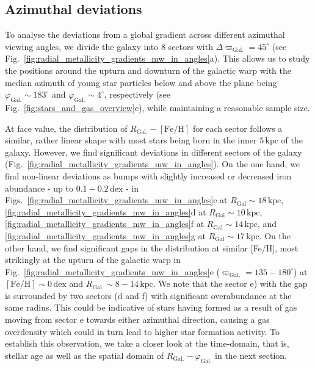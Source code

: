 \documentclass[twocolumn,apj,numberedappendix,appendixfloats,twocolappendix]{openjournal}
\begin{document}
\begin{CJK*}{UTF8}{gbsn}
\subsection{Azimuthal deviations}
\label{sec:coherence_azimuth_radial_metallicity_gradients}

To analyse the deviations from a global gradient across different azimuthal viewing angles, we divide the galaxy into 8 sectors with $\Delta \varpi_\mathrm{Gal.} = 45^\circ$ (see Fig.~\ref{fig:radial_metallicity_gradients_mw_in_angles}a). This allows us to study the positions around the upturn and downturn of the galactic warp with the median azimuth of young star particles below and above the plane being $\varphi_\mathrm{Gal.} \sim 183^\circ$ and $\varphi_\mathrm{Gal.} \sim 4^\circ$, respectively (see Fig.~\ref{fig:stars_and_gas_overview}e), while maintaining a reasonable sample size.

At face value, the distribution of $R_\mathrm{Gal.}-\mathrm{[Fe/H]}$ for each sector follows a similar, rather linear shape with most stars being born in the inner $5\,\mathrm{kpc}$ of the galaxy. However, we find significant deviations in different sectors of the galaxy (Fig.~\ref{fig:radial_metallicity_gradients_mw_in_angles}). On the one hand, we find non-linear deviations as bumps with slightly increased or decreased iron abundance - up to $0.1-0.2\,\mathrm{dex}$ - in Figs.~\ref{fig:radial_metallicity_gradients_mw_in_angles}c at $R_\mathrm{Gal} \sim 18\,\mathrm{kpc}$, \ref{fig:radial_metallicity_gradients_mw_in_angles}d at $R_\mathrm{Gal} \sim 10\,\mathrm{kpc}$, \ref{fig:radial_metallicity_gradients_mw_in_angles}f at $R_\mathrm{Gal} \sim 14\,\mathrm{kpc}$, and \ref{fig:radial_metallicity_gradients_mw_in_angles}g at $R_\mathrm{Gal} \sim 17\,\mathrm{kpc}$. On the other hand, we find significant gaps in the distribution at similar [Fe/H], most strikingly at the upturn of the galactic warp in Fig.~\ref{fig:radial_metallicity_gradients_mw_in_angles}e ($\varpi_\mathrm{Gal.} = 135-180^\circ$) at $\mathrm{[Fe/H]} \sim 0\,\mathrm{dex}$ and $R_\mathrm{Gal.} \sim 8-14\,\mathrm{kpc}$. We note that the sector e) with the gap is surrounded by two sectors (d and f) with significant overabundance at the same radius. This could be indicative of stars having formed as a result of gas moving from sector e towards either azimuthal direction, causing a gas overdensity which could in turn lead to higher star formation activity. To establish this observation, we take a closer look at the time-domain, that is, stellar age as well as the spatial domain of $R_\mathrm{Gal.}-\varphi_\mathrm{Gal.}$ in the next section. 


\end{CJK*}
\end{document}
